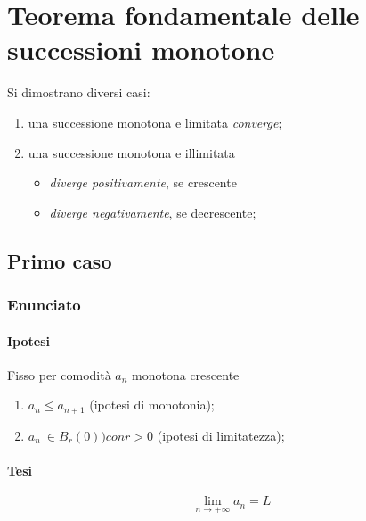 \documentclass[../../dimostrazioni]{subfiles}
\begin{document}
    \chapter{Teorema fondamentale delle successioni monotone}

        Si dimostrano diversi casi:
        \begin{enumerate}
            \indentitem \item una successione monotona e limitata \emph{converge};
            \indentitem \item una successione monotona e illimitata
                \begin{itemize}
                    \item \emph{diverge positivamente}, se crescente
                    \item \emph{diverge negativamente}, se decrescente;
                \end{itemize}
        \end{enumerate}            


        \section*{Primo caso}
            
            \subsection*{Enunciato}
                
                \subsubsection*{Ipotesi}
                         
                Fisso per comodità \(a_n\) monotona crescente

                \begin{enumerate}
                    \indentitem \item \(a_n \leqslant a_{n+1}\) (ipotesi di monotonia);
                    \indentitem \item \(a_n\ \in B_r(0)) con r > 0 \) (ipotesi di limitatezza);
                \end{enumerate}
                
                \subsubsection*{Tesi}
                    \[\lim_{n \to +\infty} a_n = L\]
            
\end{document}
